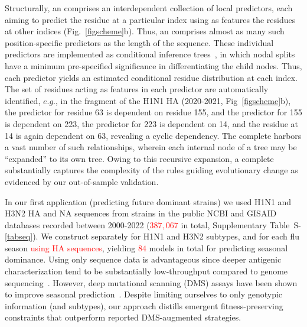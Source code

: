 \documentclass[onecolumn, compsoc,12pt]{IEEEtran}
\def\SUPPLEMENTARY{Supplementary\xspace}
\begin{document}
Structurally, an \enet comprises an interdependent collection of  local predictors, each aiming to predict the  residue at a particular index  using as features  the residues   at other  indices  (Fig.~\ref{figscheme}b). Thus,  an \enet comprises almost as many such  position-specific predictors as the length of the sequence. These individual predictors are implemented as conditional inference trees~\cite{Hothorn06unbiasedrecursive}, in which  nodal splits  have  a minimum pre-specified significance in differentiating the  child nodes. Thus, each predictor yields an estimated conditional residue distribution  at each index. The set of residues acting as features in each predictor are automatically identified, $e.g.$, in the fragment of the  H1N1 HA \enet (2020-2021, Fig~\ref{figscheme}b), the predictor for residue 63 is dependent on   residue  155, and the predictor for  155 is dependent on  223, the predictor for  223 is dependent on  14, and the residue at  14 is again dependent on  63, revealing a cyclic dependency. The complete \enet harbors a vast number of such  relationships, wherein each internal node of a tree may be  ``expanded'' to its own tree. Owing to this recursive expansion,  a complete \enet substantially captures the complexity of the rules guiding evolutionary change as evidenced by our out-of-sample validation.

In our first application (predicting future dominant strains) we used  H1N1 and H3N2 HA and NA  sequences from \infl strains in the public NCBI and GISAID databases recorded between 2000-2022 (\textcolor{red}{$387,067$} in total, \SUPPLEMENTARY Table~S-\ref{tabseq}). We  construct  separately for H1N1 and H3N2 subtypes, and for each flu season \textcolor{red}{using HA sequences}, yielding \textcolor{red}{$84$} models in total for predicting seasonal dominance. Using only sequence data is advantageous since deeper antigenic characterization  tend to be substantially  low-throughput compared to genome sequencing~\cite{wood2012reproducibility}. However,   deep mutational scanning (DMS) assays  have been shown to improve seasonal prediction~\cite{huddleston2020integrating}. Despite limiting ourselves to only genotypic  information (and subtypes), our approach  distills  emergent  fitness-preserving constraints   that outperform reported DMS-augmented strategies.
\end{document}
